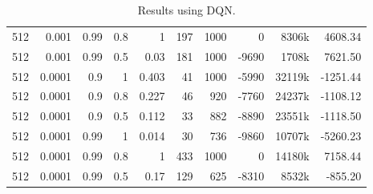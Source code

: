 \begin{table}[h]
\begin{tabular}{r r r r | r r r r r r}
			512 & 0.001 & 0.99 & 0.8 & 1 & 197 & 1000 & 0 & 8306k & 4608.34 \\
			512 & 0.001 & 0.99 & 0.5 & 0.03 & 181 & 1000 & -9690 & 1708k & 7621.50 \\
			512 & 0.0001 & 0.9 & 1 & 0.403 & 41 & 1000 & -5990 & 32119k & -1251.44 \\
			512 & 0.0001 & 0.9 & 0.8 & 0.227 & 46 & 920 & -7760 & 24237k & -1108.12 \\
			512 & 0.0001 & 0.9 & 0.5 & 0.112 & 33 & 882 & -8890 & 23551k & -1118.50 \\
			512 & 0.0001 & 0.99 & 1 & 0.014 & 30 & 736 & -9860 & 10707k & -5260.23 \\
			512 & 0.0001 & 0.99 & 0.8 & 1 & 433 & 1000 & 0 & 14180k & 7158.44 \\
			512 & 0.0001 & 0.99 & 0.5 & 0.17 & 129 & 625 & -8310 & 8532k & -855.20 \\
		\bottomrule
	\end{tabular}
	\caption{Results using DQN.}
	\label{dqn_results}
\end{table}

